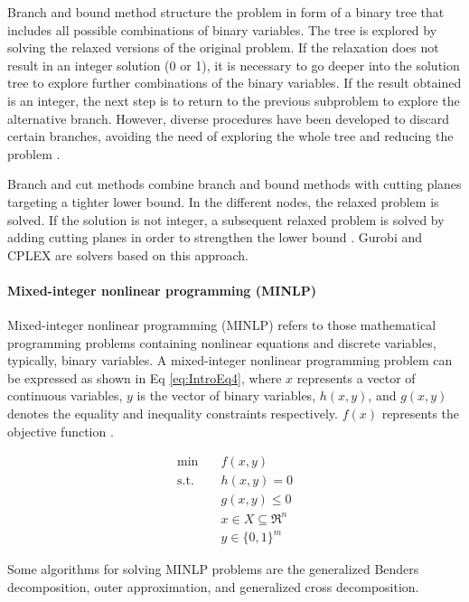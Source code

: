 \begin{refsection}[referencesCh1]
Branch and bound method structure the problem in form of a binary tree that includes all possible combinations of binary variables. The tree is explored by solving the relaxed versions of the original problem.  If the relaxation does not result in an integer solution (0 or 1), it is necessary to go deeper into the solution tree to explore further combinations of the binary variables. If the result obtained is an integer, the next step is to return to the previous subproblem to explore the alternative branch. However, diverse procedures have been developed to discard certain branches, avoiding the need of exploring the whole tree and reducing the problem \citep{floudas1995nonlinear}.

Branch and cut methods combine branch and bound methods with cutting planes targeting a tighter lower bound. In the different nodes, the relaxed problem is solved. If the solution is not integer, a subsequent relaxed problem is solved by adding cutting planes in order to strengthen the lower bound \citep{grossmann2021advanced}. Gurobi \citep{gurobi} and CPLEX \citep{cplex2009v12} are solvers based on this approach.

\paragraph{Mixed-integer nonlinear programming (MINLP)}
Mixed-integer nonlinear programming (MINLP) refers to those mathematical programming problems containing nonlinear equations and discrete variables, typically, binary variables. A mixed-integer nonlinear programming problem can be expressed as shown in Eq \ref{eq:IntroEq4}, where $x$ represents a vector of continuous variables, $y$ is the vector of binary variables, $h(x,y)$, and $g(x,y)$ denotes the equality and inequality constraints respectively. $f(x)$ represents the objective function \citep{grossmann2021advanced}.

\begin{align}
	\min \quad & f(x,y) \nonumber\\
	\textrm{s.t.} \quad & h(x,y)=0 \nonumber\\
	& g(x,y) \leq 0 \label{eq:IntroEq4} \\
	& x \in X  \subseteq \Re^{n} \nonumber\\ 
	& y \in \lbrace 0,1 \rbrace ^{m} \nonumber
\end{align}  

Some algorithms for solving MINLP problems are the generalized Benders decomposition, outer approximation, and generalized cross decomposition. 


\end{refsection}
